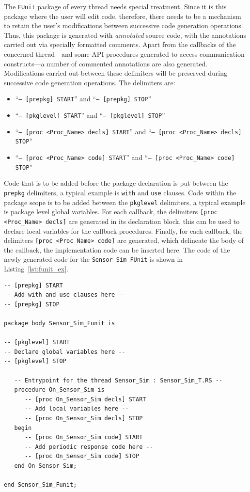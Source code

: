 The \texttt{FUnit} package of every thread needs special
treatment. Since it is this package where the user will edit code,
therefore, there needs to be a mechanism to retain the user's
modifications between successive code generation operations. Thus,
this package is generated with \emph{annotated} source code, with the
annotations carried out via specially formatted comments. Apart from
the callbacks of the concerned thread---and some API procedures
generated to access communication constructs---a number of commented
annotations are also generated. Modifications carried out between
these delimiters will be preserved during successive code generation
operations. The delimiters are:

\begin{itemize}
\item{``\texttt{-- [prepkg] START}'' and ``\texttt{-- [prepkg]
    STOP}''}
\item{``\texttt{-- [pkglevel] START}'' and ``\texttt{-- [pkglevel]
    STOP}''}
\item{``\texttt{-- [proc <Proc\_Name> decls] START}'' and ``\texttt{-- [proc
      <Proc\_Name> decls] STOP}''}
\item{``\texttt{-- [proc <Proc\_Name> code] START}'' and ``\texttt{-- [proc
      <Proc\_Name> code] STOP}''}
\end{itemize}

Code that is to be added before the package declaration is put between
the \texttt{prepkg} delimiters, a typical example is \texttt{with} and
\texttt{use} clauses. Code within the package scope is to be added
between the \texttt{pkglevel} delimiters, a typical example is package
level global variables. For each callback, the delimiters \texttt{[proc
<Proc\_Name> decls]} are generated in its declaration block, this can
be used to declare local variables for the callback
procedures. Finally, for each callback, the delimiters \texttt{[proc
    <Proc\_Name> code]} are generated, which delineate the body of the
callback, the implementation code can be inserted here. The code of
the newly generated code for the \texttt{Sensor\_Sim\_FUnit} is shown
in Listing~\ref{lst:funit_ex}.

\begin{minipage}{\listingwidth}
\flushleft
\lstset{language=ada}
\begin{lstlisting}[label=lst:funit_ex, caption=A newly generated
    functional unit for a periodic thread.]
-- [prepkg] START
-- Add with and use clauses here --
-- [prepkg] STOP

package body Sensor_Sim_Funit is

-- [pkglevel] START
-- Declare global variables here --
-- [pkglevel] STOP

   -- Entrypoint for the thread Sensor_Sim : Sensor_Sim_T.RS --
   procedure On_Sensor_Sim is
      -- [proc On_Sensor_Sim decls] START
      -- Add local variables here --
      -- [proc On_Sensor_Sim decls] STOP
   begin
      -- [proc On_Sensor_Sim code] START
      -- Add periodic response code here --
      -- [proc On_Sensor_Sim code] STOP
   end On_Sensor_Sim;

end Sensor_Sim_Funit;
\end{lstlisting}
\end{minipage}

